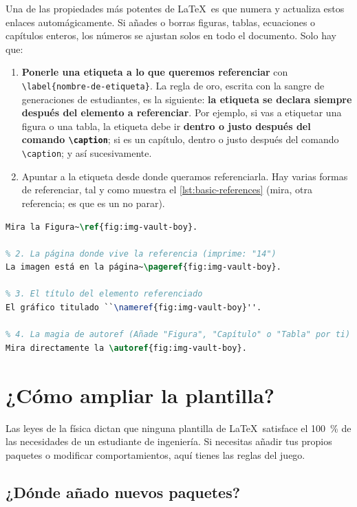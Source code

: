 Una de las propiedades más potentes de \LaTeX\ es que numera y actualiza estos enlaces automágicamente. Si añades o borras figuras, tablas, ecuaciones o capítulos enteros, los números se ajustan solos en todo el documento. Solo hay que:

\begin{enumerate}
    \item \textbf{Ponerle una etiqueta a lo que queremos referenciar} con \lstinline|\label{nombre-de-etiqueta}|. La regla de oro, escrita con la sangre de generaciones de estudiantes, es la siguiente: \textbf{la etiqueta se declara siempre después del elemento a referenciar}. Por ejemplo, si vas a etiquetar una figura o una tabla, la etiqueta debe ir \textbf{dentro o justo después del comando \texttt{\textbackslash caption}}; si es un capítulo, dentro o justo después del comando \texttt{\textbackslash caption}; y así sucesivamente.
    \item Apuntar a la etiqueta desde donde queramos referenciarla. Hay varias formas de referenciar, tal y como muestra el \autoref{lst:basic-references} (mira, otra referencia; es que es un no parar).
\end{enumerate}


\begin{lstlisting}[language=tex, caption=Distintas formas de referenciar, label={lst:basic-references}]
% 1. La referencia clásica (solo imprime el número: "3")
Mira la Figura~\ref{fig:img-vault-boy}.

% 2. La página donde vive la referencia (imprime: "14")
La imagen está en la página~\pageref{fig:img-vault-boy}.

% 3. El título del elemento referenciado
El gráfico titulado ``\nameref{fig:img-vault-boy}''.

% 4. La magia de autoref (Añade "Figura", "Capítulo" o "Tabla" por ti)
Mira directamente la \autoref{fig:img-vault-boy}.
\end{lstlisting}

\chapter{¿Cómo ampliar la plantilla?}
\label{ch:ampliar}

Las leyes de la física dictan que ninguna plantilla de \LaTeX\ satisface el \qty{100}{\percent} de las necesidades de un estudiante de ingeniería. Si necesitas añadir tus propios paquetes o modificar comportamientos, aquí tienes las reglas del juego.

\section{¿Dónde añado nuevos paquetes?}

